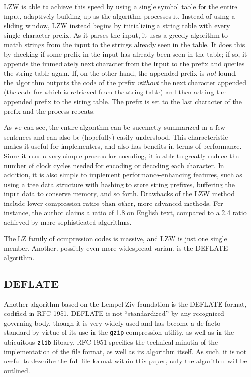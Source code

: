 \documentclass[12pt]{article}
\begin{document}
LZW is able to achieve this speed by using a single symbol table for
the entire input, adaptively building up as the algorithm processes
it. Instead of using a sliding window, LZW instead begins by
initializing a string table with every single-character prefix. As it
parses the input, it uses a greedy algorithm to match strings from the
input to the strings already seen in the table. It does this by
checking if some prefix in the input has already been seen in the
table; if so, it appends the immediately next character from the input
to the prefix and queries the string table again. If, on the other
hand, the appended prefix is \emph{not} found, the algorithm outputs
the code of the prefix \emph{without} the next character appended (the
code for which is retrieved from the string table) and then adding the
appended prefix to the string table. The prefix is set to the last
character of the prefix and the process repeats.

As we can see, the entire algorithm can be succinctly summarized in a
few sentences and can also be (hopefully) easily understood. This
characteristic makes it useful for implementers, and also has benefits
in terms of performance. Since it uses a very simple process for
encoding, it is able to greatly reduce the number of clock cycles
needed for encoding or decoding each character. In addition, it is
also simple to implement performance-enhancing features, such as using
a tree data structure with hashing to store string prefixes, buffering
the input data to conserve memory, and so forth. Drawbacks of the LZW
method include lower compression ratios than other, more advanced
methods. For instance, the author claims a ratio of 1.8 on English
text, compared to a 2.4 ratio achieved by more sophisticated
algorithms. \cite{LempelZivWelch}

The LZ family of compression codes is massive, and LZW is just one
single member. Another, possibly even more widespread variant is the
DEFLATE algorithm.

\subsection{DEFLATE}

Another algorithm based on the Lempel-Ziv foundation is the DEFLATE
format, codified in RFC 1951. \cite{RFC1951} DEFLATE is not
``standardized'' by any recognized governing body, though it is very
widely used and has become a de facto standard by virtue of its use in
the \texttt{gzip} compression utility, as well as in the ubiquitous
\texttt{zlib} library. RFC 1951 specifies the technical minutia of the
implementation of the file format, as well as its algorithm itself. As
such, it is not useful to describe the full file format within this
paper, only the algorithm will be outlined.
\end{document}
